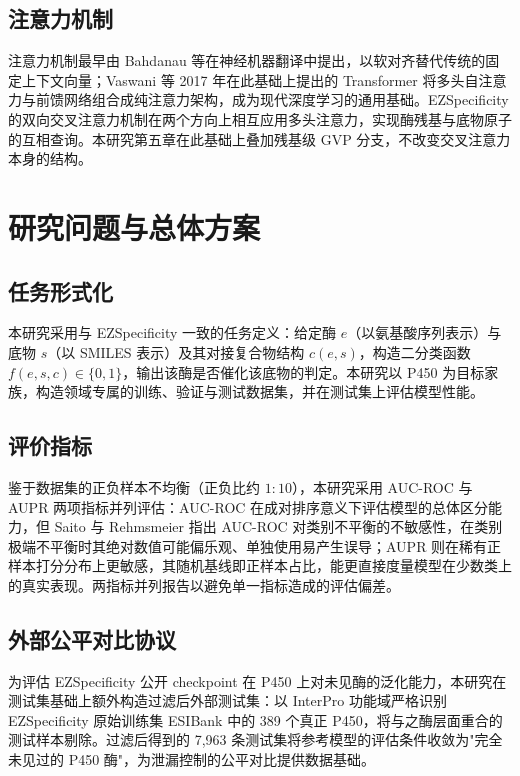 \subsection{注意力机制}
\label{subsec:rep-attn}

注意力机制最早由 Bahdanau 等在神经机器翻译中提出\cite{Bahdanau2015}，以软对齐替代传统的固定上下文向量；Vaswani 等 2017 年在此基础上提出的 Transformer\cite{Transformer2017} 将多头自注意力与前馈网络组合成纯注意力架构，成为现代深度学习的通用基础。EZSpecificity 的双向交叉注意力机制在两个方向上相互应用多头注意力，实现酶残基与底物原子的互相查询。本研究第五章在此基础上叠加残基级 GVP 分支，不改变交叉注意力本身的结构。

\section{研究问题与总体方案}
\label{sec:problem-formulation}

\subsection{任务形式化}
\label{subsec:problem-task}

本研究采用与 EZSpecificity 一致的任务定义：给定酶 $e$（以氨基酸序列表示）与底物 $s$（以 SMILES 表示）及其对接复合物结构 $c(e, s)$，构造二分类函数 $f(e, s, c) \in \{0, 1\}$，输出该酶是否催化该底物的判定。本研究以 P450 为目标家族，构造领域专属的训练、验证与测试数据集，并在测试集上评估模型性能。

\subsection{评价指标}
\label{subsec:problem-metrics}

鉴于数据集的正负样本不均衡（正负比约 $1{:}10$），本研究采用 AUC-ROC 与 AUPR 两项指标并列评估：AUC-ROC 在成对排序意义下评估模型的总体区分能力，但 Saito 与 Rehmsmeier\cite{Saito2015} 指出 AUC-ROC 对类别不平衡的不敏感性，在类别极端不平衡时其绝对数值可能偏乐观、单独使用易产生误导；AUPR 则在稀有正样本打分分布上更敏感，其随机基线即正样本占比，能更直接度量模型在少数类上的真实表现。两指标并列报告以避免单一指标造成的评估偏差。

\subsection{外部公平对比协议}
\label{subsec:problem-protocol}

为评估 EZSpecificity 公开 checkpoint 在 P450 上对未见酶的泛化能力，本研究在测试集基础上额外构造过滤后外部测试集：以 InterPro\cite{Blum2025} 功能域严格识别 EZSpecificity 原始训练集 ESIBank\cite{EZSpec2025} 中的 389 个真正 P450，将与之酶层面重合的测试样本剔除。过滤后得到的 7{,}963 条测试集将参考模型的评估条件收敛为"完全未见过的 P450 酶"，为泄漏控制的公平对比提供数据基础。

